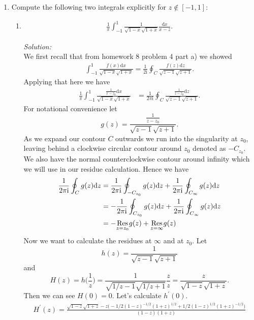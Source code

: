 \documentclass[10pt]{amsart}
\newcommand{\D}{\mathrm{d}}
\newcommand{\I}{\mathrm{i}}
\theoremstyle{nonumberplain}
\begin{document}
\begin{enumerate}[label={\bf {\arabic*}:}]
\begin{enumerate}
\end{enumerate}
\newpage


\item Compute the following two integrals explicitly for $ z \not \in [-1,1]$:
\begin{enumerate}
\item
\begin{align*}
\frac{1}{\pi}\int_{-1}^1 \frac{1}{\sqrt{1-x} \sqrt{1 + x}} \frac{\D x}{x -z}.
\end{align*}

\textit{Solution:} \\
We first recall that from homework 8 problem 4 part a) we showed
\begin{align}
\int_{-1}^1 \frac {f(x)\D x} {\sqrt {1 - x} \sqrt {1 + x}} = \frac 1 {2 \I} \oint_C \frac {f(z)\D z} {\sqrt {z - 1} \sqrt {z + 1}}.
\label{eq:eq3}
\end{align}
Applying that here we have
\begin{align*}
\frac 1 \pi \int_{-1}^1 \frac {\frac 1 {x - z_0}\D x} {\sqrt {1 - x} \sqrt {1 + x}}
	&= \frac 1 {2 \pi \I} \oint_C \frac {\frac 1 {z - z_0}\D z} {\sqrt {z - 1} \sqrt {z + 1}}.
\end{align*}
For notational convenience let
$$g(z) = \frac {\frac 1 {z - z_0}} {\sqrt {z - 1} \sqrt {z + 1}}.$$
As we expand our contour $C$ outwards we run into the singularity at $z_0$, leaving behind a clockwise circular contour around $z_0$ denoted as $-C_{z_0}$.
We also have the normal counterclockwise contour around infinity which we will use in our residue calculation.
Hence we have
\begin{align}
\frac 1 {2 \pi \I} \oint_C g(z) \D z
	&= \frac 1 {2 \pi \I} \oint_{-C_{z_0}} g(z) \D z + \frac 1 {2 \pi \I} \oint_{C_\infty} g(z) \D z \nonumber \\
	&= - \frac 1 {2 \pi \I} \oint_{C_{z_0}} g(z) \D z + \frac 1 {2 \pi \I} \oint_{C_\infty} g(z) \D z \nonumber \\
	&= - \underset{z=z_0}{{\rm Res}} g(z)  + \underset{z=\infty}{{\rm Res}} g(z) \label{eq:eq4}
\end{align}
Now we want to calculate the residues at $\infty$ and at $z_0$.
Let
$$ h(z) = \frac 1 {\sqrt {z - 1} \sqrt {z + 1}} $$
and
$$H(z) = h\bigg( \frac 1 z \bigg) = \frac 1 {\sqrt {1/z - 1} \sqrt {1/z + 1}} \frac z z = \frac z {\sqrt {1 - z} \sqrt {1 + z}}. $$
Then we can see $H(0) = 0$.
Let's calculate $h^\prime(0)$.
\begin{align*}
H^\prime(z) = \frac {\sqrt {1 - z} \sqrt {1 + z} - z\big(-1/2(1 - z)^{-1/2}(1 + z)^{1/2} +1/2(1 - z)^{1/2}(1 + z)^{-1/2} \big)}{ (1 - z)(1 + z)}

\end{align*}
\end{enumerate}
\end{enumerate}
\end{document}
